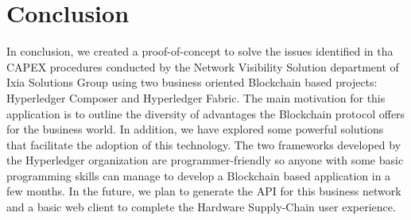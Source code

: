 \chapter{Conclusion}
\label{chapter:conclusion}
In conclusion, we created a proof-of-concept to solve the issues identified in tha CAPEX procedures conducted by the Network Visibility Solution department of Ixia Solutions Group using two business oriented Blockchain based projects: Hyperledger Composer and Hyperledger Fabric. The main motivation for this application is to outline the diversity of advantages the Blockchain protocol offers for the business world. In addition, we have explored some powerful solutions that facilitate the adoption of this technology. The two frameworks developed by the Hyperledger organization are programmer-friendly so anyone with some basic programming skills can manage to develop a Blockchain based application in a few months. In the future, we plan to generate the API for this business network and a basic web client to complete the Hardware Supply-Chain user experience. 